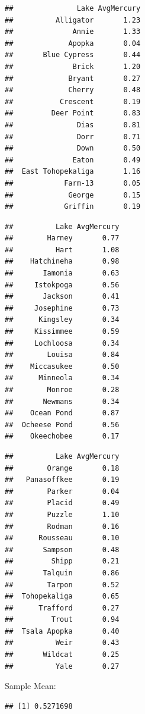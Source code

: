 \documentclass[]{book}
\newenvironment{Shaded}{\begin{snugshade}}{\end{snugshade}}
\newcommand{\KeywordTok}[1]{\textcolor[rgb]{0.13,0.29,0.53}{\textbf{#1}}}
\newcommand{\OperatorTok}[1]{\textcolor[rgb]{0.81,0.36,0.00}{\textbf{#1}}}
\newcommand{\NormalTok}[1]{#1}
\begin{document}
\begin{verbatim}
##               Lake AvgMercury
##          Alligator       1.23
##              Annie       1.33
##             Apopka       0.04
##       Blue Cypress       0.44
##              Brick       1.20
##             Bryant       0.27
##             Cherry       0.48
##           Crescent       0.19
##         Deer Point       0.83
##               Dias       0.81
##               Dorr       0.71
##               Down       0.50
##              Eaton       0.49
##  East Tohopekaliga       1.16
##            Farm-13       0.05
##             George       0.15
##            Griffin       0.19
\end{verbatim}

\begin{verbatim}
##          Lake AvgMercury
##        Harney       0.77
##          Hart       1.08
##    Hatchineha       0.98
##       Iamonia       0.63
##     Istokpoga       0.56
##       Jackson       0.41
##     Josephine       0.73
##      Kingsley       0.34
##     Kissimmee       0.59
##     Lochloosa       0.34
##        Louisa       0.84
##    Miccasukee       0.50
##      Minneola       0.34
##        Monroe       0.28
##       Newmans       0.34
##    Ocean Pond       0.87
##  Ocheese Pond       0.56
##    Okeechobee       0.17
\end{verbatim}

\begin{verbatim}
##          Lake AvgMercury
##        Orange       0.18
##   Panasoffkee       0.19
##        Parker       0.04
##        Placid       0.49
##        Puzzle       1.10
##        Rodman       0.16
##      Rousseau       0.10
##       Sampson       0.48
##         Shipp       0.21
##       Talquin       0.86
##        Tarpon       0.52
##  Tohopekaliga       0.65
##      Trafford       0.27
##         Trout       0.94
##  Tsala Apopka       0.40
##          Weir       0.43
##       Wildcat       0.25
##          Yale       0.27
\end{verbatim}

Sample Mean:

\begin{Shaded}
\end{Shaded}

\begin{verbatim}
## [1] 0.5271698
\end{verbatim}
\end{document}
